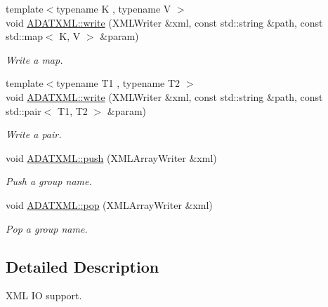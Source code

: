 \begin{DoxyCompactItemize}
\item 
{\footnotesize template$<$typename K , typename V $>$ }\\void \mbox{\hyperlink{group__io_gaab13ff0d8972a4435cd3590b6c87ea05}{A\+D\+A\+T\+X\+M\+L\+::write}} (X\+M\+L\+Writer \&xml, const std\+::string \&path, const std\+::map$<$ K, V $>$ \&param)
\begin{DoxyCompactList}\small\item\em Write a map. \end{DoxyCompactList}\item 
{\footnotesize template$<$typename T1 , typename T2 $>$ }\\void \mbox{\hyperlink{group__io_gabcda0d5bebd682903ae663861766df8b}{A\+D\+A\+T\+X\+M\+L\+::write}} (X\+M\+L\+Writer \&xml, const std\+::string \&path, const std\+::pair$<$ T1, T2 $>$ \&param)
\begin{DoxyCompactList}\small\item\em Write a pair. \end{DoxyCompactList}\item 
void \mbox{\hyperlink{group__io_ga957f4130fa008139cd16879b0794ae54}{A\+D\+A\+T\+X\+M\+L\+::push}} (X\+M\+L\+Array\+Writer \&xml)
\begin{DoxyCompactList}\small\item\em Push a group name. \end{DoxyCompactList}\item 
void \mbox{\hyperlink{group__io_gafc9d3fe6a9094c09371a9213eb4b6cdd}{A\+D\+A\+T\+X\+M\+L\+::pop}} (X\+M\+L\+Array\+Writer \&xml)
\begin{DoxyCompactList}\small\item\em Pop a group name. \end{DoxyCompactList}\end{DoxyCompactItemize}


\subsection{Detailed Description}
X\+ML IO support. 

